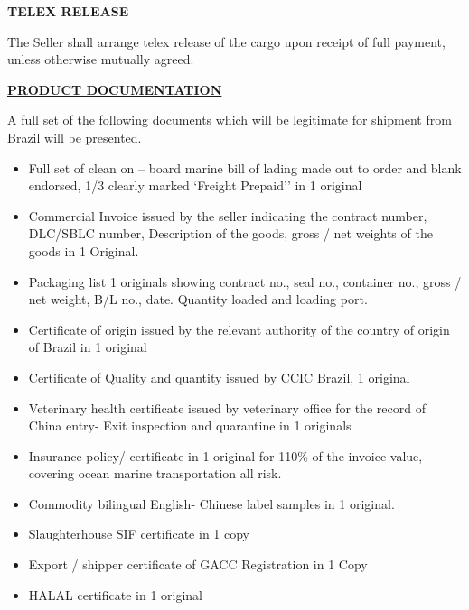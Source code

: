 \documentclass[a4paper,11pt]{article}
\begin{document}
\vspace{0.3cm}
\begin{center}{\large\textbf{\color{marooncolor}TELEX RELEASE}}\end{center}
\vspace{0.1cm}
\noindent The Seller shall arrange telex release of the cargo upon receipt of full payment, unless otherwise mutually agreed.

\newpage

\begin{center}{\large\textbf{\underline{\color{marooncolor}PRODUCT DOCUMENTATION}}}\end{center}
\vspace{0.2cm}
\noindent A full set of the following documents which will be legitimate for shipment from Brazil will be presented.
\vspace{0.1cm}
\begin{itemize}[leftmargin=1.5em, itemsep=3pt, topsep=2pt]
\item Full set of clean on -- board marine bill of lading made out to order and blank endorsed, 1/3 clearly marked `Freight Prepaid'' in 1 original
\item Commercial Invoice issued by the seller indicating the contract number, DLC/SBLC number, Description of the goods, gross / net weights of the goods in 1 Original.
\item Packaging list 1 originals showing contract no., seal no., container no., gross / net weight, B/L no., date. Quantity loaded and loading port.
\item Certificate of origin issued by the relevant authority of the country of origin of Brazil in 1 original
\item Certificate of Quality and quantity issued by CCIC Brazil, 1 original
\item Veterinary health certificate issued by veterinary office for the record of China entry- Exit inspection and quarantine in 1 originals
\item Insurance policy/ certificate in 1 original for 110\% of the invoice value, covering ocean marine transportation all risk.
\item Commodity bilingual English- Chinese label samples in 1 original.
\item Slaughterhouse SIF certificate in 1 copy
\item Export / shipper certificate of GACC Registration in 1 Copy
\item HALAL certificate in 1 original
\end{itemize}
\end{document}

